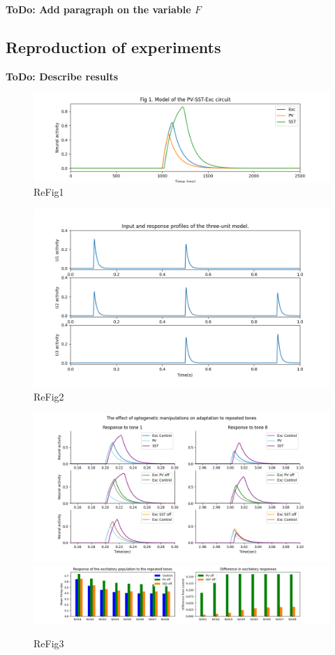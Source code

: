 \textbf{ToDo: Add paragraph on the variable $F$} 


\subsection{Reproduction of experiments}

\textbf{ToDo: Describe results}

\begin{figure}
 \includegraphics[width=\textwidth]{Figures/Fig1}
 \caption{ReFig1}
\end{figure}

\begin{figure}
 \includegraphics[width=\textwidth]{Figures/Fig2}
 \caption{ReFig2}
\end{figure}

\begin{figure}
 
 \includegraphics[width=\textwidth]{Figures/Fig3B}
 \includegraphics[width=\textwidth]{Figures/Fig3C}
 \caption{ReFig3}
\end{figure}

